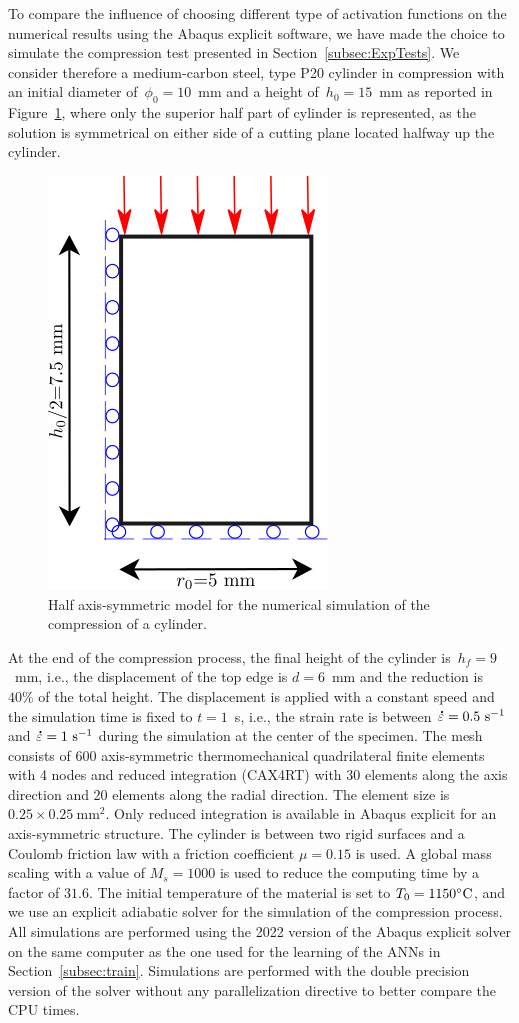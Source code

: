 \documentclass[algorithms,article,submit,pdftex,oneauthors]{Definitions/mdpi}
\makeatletter
\DeclareRobustCommand{\mdot}[1]{\accentset{\mbox{\bfseries .}}{#1}}
\DeclareRobustCommand{\ie}{i.e.,\@\xspace}
\DeclareRobustCommand{\ps}{\text{s}^{-1}}
\DeclareRobustCommand{\GPa}{\text{GPa}}
\makeatother
\begin{document}
To compare the influence of choosing different type of activation functions on the numerical results using the Abaqus explicit software, we have made the choice to simulate the compression test presented in Section~\ref{subsec:ExpTests}.
We consider therefore a medium-carbon steel, type P20 cylinder in compression with an initial diameter of~$\phi_{0}=10$~mm and a height of~$h_{0}=15$~mm as reported in Figure~\ref{fig:Num-model}, where only the superior half part of cylinder is represented, as the solution is symmetrical on either side of a cutting plane located halfway up the cylinder.
\begin{figure}[h!]
\centering
\includegraphics[width=0.25\columnwidth]{Figures/CyCompression}
\caption{Half axis-symmetric model for the numerical simulation of the compression of a cylinder.}
\label{fig:Num-model}
\end{figure}
At the end of the compression process, the final height of the cylinder is~$h_f=9$~mm, \ie the displacement of the top edge is $d=6$~mm and the reduction is $40\%$ of the total height.
The displacement is applied with a constant speed and the simulation time is fixed to $t=1$~s, \ie the strain rate is between $\mdot{\varepsilon}=0.5~\ps$ and $\mdot{\varepsilon}=1~\ps$ during the simulation at the center of the specimen.
The mesh consists of $600$ axis-symmetric thermomechanical quadrilateral finite elements with 4 nodes and reduced integration (CAX4RT) with 30 elements along the axis direction and 20 elements along the radial direction.
The element size is $0.25\times0.25~\text{mm}^2$.
Only reduced integration is available in Abaqus explicit for an axis-symmetric structure.
The cylinder is between two rigid surfaces and a Coulomb friction law with a friction coefficient $\mu=0.15$ is used.
A global mass scaling with a value of $M_s=1000$ is used to reduce the computing time by a factor of $31.6$.
The initial temperature of the material is set to $T_{0}=1150\celsius$, and we use an explicit adiabatic solver for the simulation of the compression process.
All simulations are performed using the 2022 version of the Abaqus explicit solver on the same computer as the one used for the learning of the ANNs in Section~\ref{subsec:train}.
Simulations are performed with the double precision version of the solver without any parallelization directive to better compare the CPU times.
\end{document}
